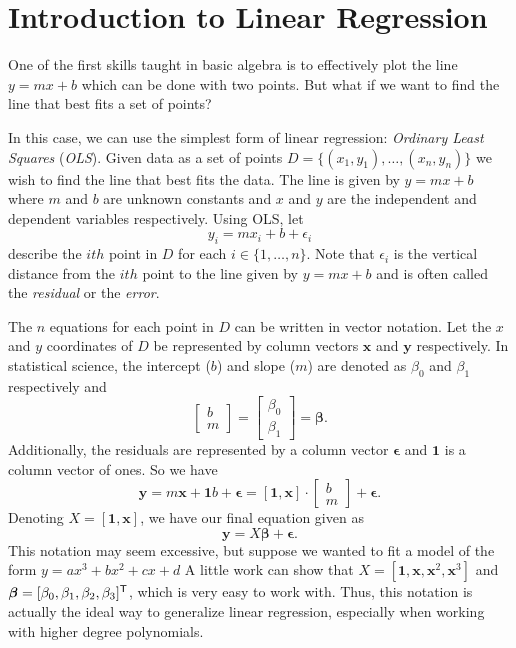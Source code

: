 \label{lab:LinearRegression}
\labdependencies{}


\section*{Introduction to Linear Regression}
One of the first skills taught in basic algebra is to effectively plot the line $y=mx+b$ which can be done with two points.
But what if we want to find the line that best fits a set of points?

In this case, we can use the simplest form of linear regression: \textit{Ordinary Least Squares} (\textit{OLS}).
Given data as a set of points $D = \{ (x_1, y_1), \ldots, (x_n, y_n) \}$ we wish to find the line that best fits the data.
The line is given by $y = mx+ b$ where $m$ and $b$ are unknown constants and $x$ and $y$ are the independent and dependent variables respectively.
Using OLS, let \[ y_i = mx_i + b + \epsilon_i \] describe the $ith$ point in $D$ for each $i \in \{1, \ldots, n\}$.
Note that $\epsilon_i$ is the vertical distance from the $ith$ point to the line given by $y = mx + b$ and is often called the \textit{residual} or the \textit{error}.

The $n$ equations for each point in $D$ can be written in vector notation.
Let the $x$ and $y$ coordinates of $D$ be represented by column vectors $\boldsymbol x$ and $\boldsymbol y$ respectively.
In statistical science, the intercept ($b$) and slope ($m$) are denoted as $\beta_0$ and $\beta_1$ respectively and
\[ \begin{bmatrix} b \\ m \end{bmatrix} = \begin{bmatrix} \beta_0 \\ \beta_1 \end{bmatrix} = \boldsymbol\beta .\]
Additionally, the residuals are represented by a column vector  $\boldsymbol\epsilon$ and $\boldsymbol 1$ is a column vector of ones.
So we have \[ \boldsymbol y = m \boldsymbol x + \boldsymbol 1 b + \boldsymbol\epsilon = [\boldsymbol 1, \boldsymbol x] \cdot \begin{bmatrix} b \\ m \end{bmatrix} + \boldsymbol\epsilon. \]
Denoting $X = [ \boldsymbol 1, \boldsymbol x ]$, we have our final equation given as \[ \boldsymbol y = X \boldsymbol\beta + \boldsymbol\epsilon . \]
This notation may seem excessive, but suppose we wanted to fit a model of the form $y=ax^3 + bx^2 + cx+d$
A little work can show that $X=[ \boldsymbol 1,\boldsymbol x, \boldsymbol x^2, \boldsymbol x^3]$ and $\boldsymbol\beta = [\beta_0, \beta_1, \beta_2, \beta_3]^{\mathsf T} $, which is very easy to work with.
Thus, this notation is actually the ideal way to generalize linear regression, especially when working with higher degree polynomials.

